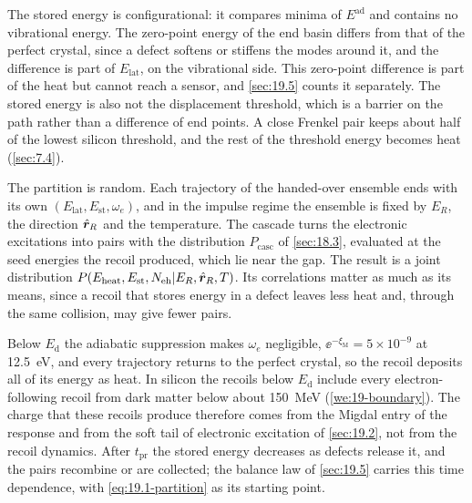 The stored energy is configurational: it compares minima of $E^{\mathrm{ad}}$ and contains no vibrational energy. The zero-point energy of the end basin differs from that of the perfect crystal, since a defect softens or stiffens the modes around it, and the difference is part of $E_{\mathrm{lat}}$, on the vibrational side. This zero-point difference is part of the heat but cannot reach a sensor, and \cref{sec:19.5} counts it separately. The stored energy is also not the displacement threshold, which is a barrier on the path rather than a difference of end points. A close Frenkel pair keeps about half of the lowest silicon threshold, and the rest of the threshold energy becomes heat (\cref{sec:7.4}).

The partition is random. Each trajectory of the handed-over ensemble ends with its own $(E_{\mathrm{lat}}, E_{\mathrm{st}}, \omega_e)$, and in the impulse regime the ensemble is fixed by $E_R$, the direction $\hat{\bm{r}}_R$ and the temperature. The cascade turns the electronic excitations into pairs with the distribution $P_{\mathrm{casc}}$ of \cref{sec:18.3}, evaluated at the seed energies the recoil produced, which lie near the gap. The result is a joint distribution $P(E_{\mathrm{heat}}, E_{\mathrm{st}}, N_{\mathrm{eh}}|E_R, \hat{\bm{r}}_R, T)$. Its correlations matter as much as its means, since a recoil that stores energy in a defect leaves less heat and, through the same collision, may give fewer pairs.

Below $E_{\mathrm{d}}$ the adiabatic suppression makes $\omega_e$ negligible, $\ee^{-\xi_{\mathrm{M}}} = 5\times10^{-9}$ at \SI{12.5}{eV}, and every trajectory returns to the perfect crystal, so the recoil deposits all of its energy as heat. In silicon the recoils below $E_{\mathrm{d}}$ include every electron-following recoil from dark matter below about \SI{150}{MeV} (\cref{we:19-boundary}). The charge that these recoils produce therefore comes from the Migdal entry of the response and from the soft tail of electronic excitation of \cref{sec:19.2}, not from the recoil dynamics. After $t_{\mathrm{pr}}$ the stored energy decreases as defects release it, and the pairs recombine or are collected; the balance law of \cref{sec:19.5} carries this time dependence, with \cref{eq:19.1-partition} as its starting point.
